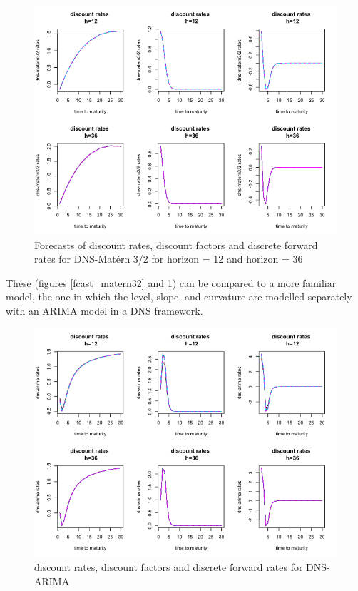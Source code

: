 \begin{figure}[!htb]
\centering
\includegraphics[width=12.5cm]{gfx/chapter-krls-models/fcast_ns_matern32}
\caption{Forecasts of discount rates, discount factors and discrete forward rates for DNS-Mat\'ern 3/2 for horizon = 12 and horizon = 36}
\label{fcast_ns_matern32}
\end{figure}

These (figures \ref{fcast_matern32} and \ref{fcast_ns_matern32}) can be compared to a more familiar model, the one in which the level, slope, and curvature are modelled separately with an ARIMA model in a DNS framework. 

\begin{figure}[!htb]
\centering
\includegraphics[width=12.5cm]{gfx/chapter-krls-models/fcast_ns_arima}
\caption{discount rates, discount factors and discrete forward rates for DNS-ARIMA}
\label{fcast_ns_arima}
\end{figure}

